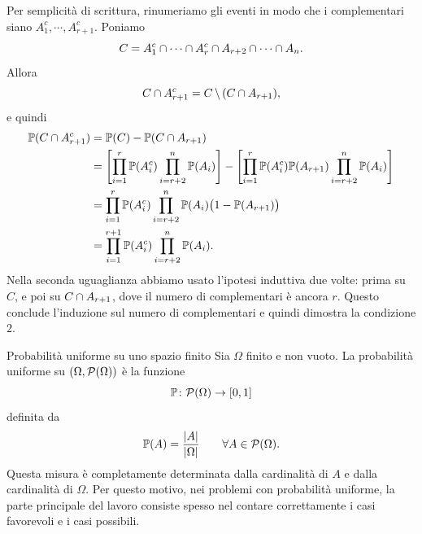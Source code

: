 \documentclass[a4paper]{article}
\begin{document}
\begin{snippetproof}{}
\begin{ffiproof}
        Per semplicità di scrittura, rinumeriamo gli eventi in modo che i complementari siano
        \(A_1^c,\cdots,A_{r+1}^c\).
        Poniamo
        \[
            C
            =
            A_1^c \cap \cdots \cap A_r^c
            \cap
            A_{r+2}\cap\cdots\cap A_n.
        \]
        Allora
        \[
            C \cap A_{r+1}^c
            =
            C \,\backslash\, (C\cap A_{r+1}),
        \]
        e quindi
        \begin{align*}
            \mathbb P(C\cap A_{r+1}^c)
            &=
            \mathbb P(C)-\mathbb P(C\cap A_{r+1}) \\
            &=
            \left[
                \prod_{i=1}^r \mathbb P(A_i^c)
                \prod_{i=r+2}^n \mathbb P(A_i)
            \right]
            -
            \left[
                \prod_{i=1}^r \mathbb P(A_i^c)
                \mathbb P(A_{r+1})
                \prod_{i=r+2}^n \mathbb P(A_i)
            \right] \\
            &=
            \prod_{i=1}^r \mathbb P(A_i^c)
            \prod_{i=r+2}^n \mathbb P(A_i)
            \bigl(1-\mathbb P(A_{r+1})\bigr) \\
            &=
            \prod_{i=1}^{r+1}\mathbb P(A_i^c)
            \prod_{i=r+2}^n \mathbb P(A_i).
        \end{align*}
        Nella seconda uguaglianza abbiamo usato l'ipotesi induttiva due volte: prima su \(C\), e poi su \(C\cap A_{r+1}\), dove il numero di complementari è ancora \(r\).
        Questo conclude l'induzione sul numero di complementari e quindi dimostra la condizione \(2\).
    \end{ffiproof}
\end{snippetproof}

\begin{snippetdefinition}{Probabilità uniforme su uno spazio finito}
    Sia \(\Omega\) finito e non vuoto.
    La probabilità uniforme su \((\Omega,\mathcal P(\Omega))\) è la funzione
    \[
        \mathbb P\colon \mathcal P(\Omega)\to[0,1]
    \]
    definita da
    \[
        \mathbb P(A)=\frac{|A|}{|\Omega|}
        \qquad
        \forall A\in\mathcal P(\Omega).
    \]
    Questa misura è completamente determinata dalla cardinalità di \(A\) e dalla cardinalità di \(\Omega\).
    Per questo motivo, nei problemi con probabilità uniforme, la parte principale del lavoro consiste spesso nel contare correttamente i casi favorevoli e i casi possibili.
\end{snippetdefinition}
\end{document}
